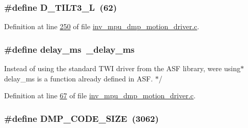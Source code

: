 \subsubsection[{\texorpdfstring{D\+\_\+\+T\+I\+L\+T3\+\_\+L}{D_TILT3_L}}]{\setlength{\rightskip}{0pt plus 5cm}\#define D\+\_\+\+T\+I\+L\+T3\+\_\+L~(62)}\hypertarget{group___d_r_i_v_e_r_s_gab62313b938bb0a02efe7584203c0c950}{}\label{group___d_r_i_v_e_r_s_gab62313b938bb0a02efe7584203c0c950}


Definition at line \hyperlink{inv__mpu__dmp__motion__driver_8c_source_l00250}{250} of file \hyperlink{inv__mpu__dmp__motion__driver_8c_source}{inv\+\_\+mpu\+\_\+dmp\+\_\+motion\+\_\+driver.\+c}.

\subsubsection[{\texorpdfstring{delay\+\_\+ms}{delay_ms}}]{\setlength{\rightskip}{0pt plus 5cm}\#define delay\+\_\+ms~\+\_\+delay\+\_\+ms}\hypertarget{group___d_r_i_v_e_r_s_gae36aca5baf9b6b7d74992aef00686d67}{}\label{group___d_r_i_v_e_r_s_gae36aca5baf9b6b7d74992aef00686d67}

\begin{DoxyItemize}
\item Instead of using the standard T\+WI driver from the A\+SF library, we\textquotesingle{}re using$\ast$ delay\+\_\+ms is a function already defined in A\+SF. $\ast$/ 
\end{DoxyItemize}

Definition at line \hyperlink{inv__mpu__dmp__motion__driver_8c_source_l00067}{67} of file \hyperlink{inv__mpu__dmp__motion__driver_8c_source}{inv\+\_\+mpu\+\_\+dmp\+\_\+motion\+\_\+driver.\+c}.

\subsubsection[{\texorpdfstring{D\+M\+P\+\_\+\+C\+O\+D\+E\+\_\+\+S\+I\+ZE}{DMP_CODE_SIZE}}]{\setlength{\rightskip}{0pt plus 5cm}\#define D\+M\+P\+\_\+\+C\+O\+D\+E\+\_\+\+S\+I\+ZE~(3062)}\hypertarget{group___d_r_i_v_e_r_s_ga304702b72a030fceea30b45d1ab53a5c}{}\label{group___d_r_i_v_e_r_s_ga304702b72a030fceea30b45d1ab53a5c}


